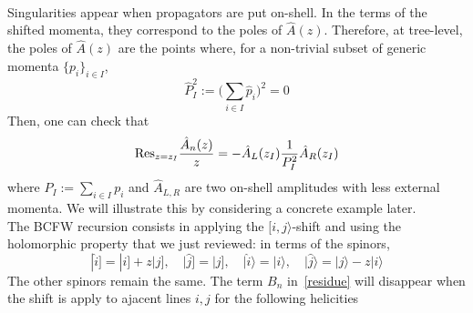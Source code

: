 \\
Singularities appear when propagators are put on-shell. 
In the terms of the shifted momenta, they correspond to the poles of $\hat{A}(z)$.
Therefore, at tree-level, the poles of $\hat{A}(z)$ are the points where, for a non-trivial subset of generic momenta $\{p_i\}_{i\in I}$, 
\begin{equation*}
\hat{P}_I^2 := \big( \sum_{i\in I} \hat{p}_i \big)^2 = 0
\end{equation*}   
%
Then, one can check that
\begin{equation*}
\mathrm{Res}_{z=z_I}\frac{\hat{A}_n(z)}{z} = - \hat{A}_L(z_I)\frac{1}{P_I^2}\hat{A}_R(z_I)
\end{equation*}
where $P_I := \sum_{i\in I}p_i$ and $\hat{A}_{L,R}$ are two on-shell amplitudes with less external momenta.
We will illustrate this by considering a concrete example later.
%
%
\\
The BCFW recursion consists in applying the $[i,j\rangle$-shift and using the holomorphic property that we just reviewed:
in terms of the spinors,
\begin{equation}
|\hat{i}] = |i] + z |j], \quad |\hat{j}] = |j], \quad|\hat{i}\rangle = |i\rangle, \quad |\hat{j}\rangle = |j\rangle - z|i\rangle
\end{equation}  
The other spinors remain the same. 
The term $B_n$ in~\cref{residue} will disappear when the shift is apply to ajacent lines $i,j$ for the following helicities






